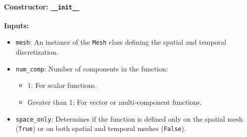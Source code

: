 \documentclass{article}
\begin{document}
			\paragraph{Constructor: \texttt{\_\_init\_\_}}
			\textbf{Inputs:}
			\begin{itemize}
				\item \texttt{mesh}: An instance of the \texttt{Mesh} class defining the spatial and temporal discretization.
				\item \texttt{num\_comp}: Number of components in the function:
				\begin{itemize}
					\item 1: For scalar functions.
					\item Greater than 1: For vector or multi-component functions.
				\end{itemize}
				\item \texttt{space\_only}: Determines if the function is defined only on the spatial mesh (\texttt{True}) or on both spatial and temporal meshes (\texttt{False}).
			\end{itemize}
			
\end{document}
